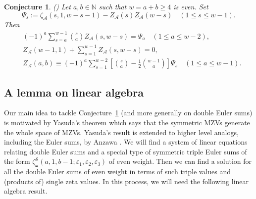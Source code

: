 \documentclass{article}
\newcommand{\sha}{\shuffle}
\newcommand{\Sy}{{\mathcal S}}
\newcommand\eps{{\varepsilon}}
\newcommand{\calA}{\mathcal{A}}
\newcommand{\N}{\mathbb{N}}
\theoremstyle{plain}
\newtheorem{conj}[thm]{Conjecture}
\theoremstyle{definition}
\begin{document}
\begin{conj}\label{conj:KZeffDBZs} \emph{(\cite[(65)]{KanekoZa2026})}
Let $a,b\in\N$ such that $w=a+b\ge 4$ is even. Set
\begin{equation*}
\Psi_s:=\zeta_\calA(s,1,w-s-1)-Z_\calA(s)Z_\calA(w-s) \quad (1\le s\le w-1).
\end{equation*}
Then
\begin{align} \label{equ:KZrel1}
&\, (-1)^a \sum_{s=a}^{w-1} \binom{s}{a} Z_\calA(s,w-s) =\Psi_a
     \quad (1\le a\le w-2),\\
&\, Z_\calA(w-1,1)+\sum_{s=1}^{w-1} Z_\calA(s,w-s) =0, \label{equ:KZrel2} \\
&\, Z_\calA(a,b)\equiv(-1)^a \sum_{s=1}^{w-2} \left[ \binom{s}{a}-\frac12\binom{w-1}{a}\right] \Psi_s   \quad (1\le a\le w-1). \label{equ:KZrel3}
\end{align}
\end{conj}


\subsection{A lemma on linear algebra}
Our main idea to tackle Conjecture~\ref{conj:KZeffDBZs} (and more generally on double Euler sums) is motivated by Yasuda's theorem \cite{Yasuda2016} which says that the symmetric MZVs generate the whole space of MZVs. Yasuda's result is extended to higher level analogs, including the Euler sums, by Anzawa \cite{Anzawa2024}.  We will find a system  of linear equations relating double Euler sums and a special type of symmetric triple Euler sums of the form $\zeta_\sha^\Sy(a,1,b-1;\eps_1,\eps_2,\eps_3)$ of even weight. Then we can find a solution for all the double Euler sums  of even weight in terms of such triple values and (products of) single zeta values. In this process, we will need the following linear algebra result.
\end{document}
